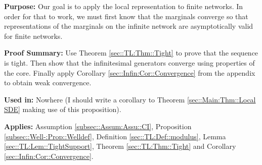\documentclass[12pt]{article}
\newcommand{\purpose}{\textbf{Purpose: }}
\newcommand{\pfsum}{\textbf{Proof Summary: }}
\newcommand{\usein}{\textbf{Used in: }}
\newcommand{\app}{\textbf{Applies: }}
\begin{document}
\purpose Our goal is to apply the local representation to finite networks. In order for that to work, we must first know that the marginals converge so that representations of the marginals on the infinite network are asymptotically valid for finite networks.

\pfsum Use Theorem \ref{sec::TL:Thm::Tight} to prove that the sequence is tight. Then show that the infinitesimal generators converge using properties of the core. Finally apply Corollary \ref{sec::Infin:Cor::Convergence} from the appendix to obtain weak convergence.

\usein Nowhere (I should write a corollary to Theorem \ref{sec::Main:Thm::Local SDE} making use of this proposition).

\app Assumption \ref{subsec::Assum:Assu::CI}, Proposition \ref{subsec::Well-:Prop::Welldef}, Definition \ref{sec::TL:Def::modulus}, Lemma \ref{sec::TL:Lem::TightSupport}, Theorem \ref{sec::TL:Thm::Tight} and Corollary \ref{sec::Infin:Cor::Convergence}.
\end{document}
